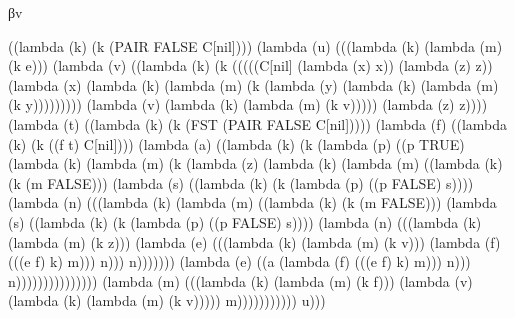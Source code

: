 \documentclass[ms,electronic,twosidetoc,letterpaper,chaptercenter,parttop]{byumsphd}
\begin{document}
\begin{theorem}
βv
\begin{schemedisplay}
((lambda (k) (k (PAIR FALSE C[nil])))
 (lambda (u) (((lambda (k) (lambda (m) (k e)))
         (lambda (v) ((lambda (k) (k (((((C[nil] (lambda (x) x)) (lambda (z) z))
                            (lambda (x) (lambda (k) (lambda (m) (k (lambda (y) (lambda (k) (lambda (m) (k y)))))))))
                           (lambda (v) (lambda (k) (lambda (m) (k v))))) (lambda (z) z))))
                (lambda (t) ((lambda (k) (k (FST
                                 (PAIR FALSE C[nil]))))
                       (lambda (f) ((lambda (k) (k ((f t) C[nil])))
                              (lambda (a) ((lambda (k) (k (lambda (p) ((p TRUE)
                                                     (lambda (k) (lambda (m) (k (lambda (z) (lambda (k) (lambda (m) ((lambda (k) (k (m FALSE)))
                                                                                       (lambda (s) ((lambda (k) (k (lambda (p) ((p FALSE) s))))
                                                                                              (lambda (n) (((lambda (k) (lambda (m) ((lambda (k) (k (m FALSE)))
                                                                                                                   (lambda (s) ((lambda (k) (k (lambda (p) ((p FALSE) s))))
                                                                                                                          (lambda (n) (((lambda (k) (lambda (m) (k z)))
                                                                                                                                  (lambda (e) (((lambda (k) (lambda (m) (k v)))
                                                                                                                                          (lambda (f) (((e f) k) m))) n))) n)))))))
                                                                                                      (lambda (e) ((a (lambda (f) (((e f) k) m))) n))) n)))))))))))))))
                                     (lambda (m) (((lambda (k) (lambda (m) (k f)))
                                             (lambda (v) (lambda (k) (lambda (m) (k v))))) m))))))))))) u)))
\end{schemedisplay}


\end{theorem}
\end{document}

